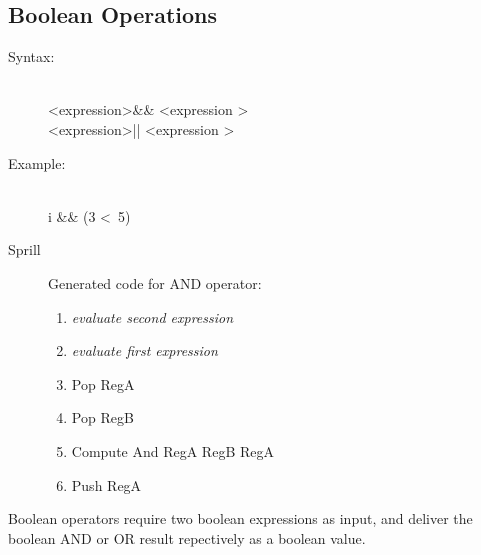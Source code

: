 \documentclass[10pt,a4paper]{report}
\begin{document}
\subsection{Boolean Operations}
\begin{description}
	\item[Syntax:] \hfill \\ 
		\textless expression\textgreater \&\& \textless expression \textgreater \\
		\textless expression\textgreater || \textless expression \textgreater
	\item[Example:] \hfill \\
		i \&\& (3 \textless ~5)
	\item[Sprill] Generated code for AND operator:
		\begin{enumerate}
			\item \emph{evaluate second expression}
			\item \emph{evaluate first expression}
			\item Pop RegA
			\item Pop RegB
			\item Compute And RegA RegB RegA
			\item Push RegA
		\end{enumerate}
\end{description}
Boolean operators require two boolean expressions as input, and deliver the boolean AND or OR result repectively as a boolean value.
\end{document}
